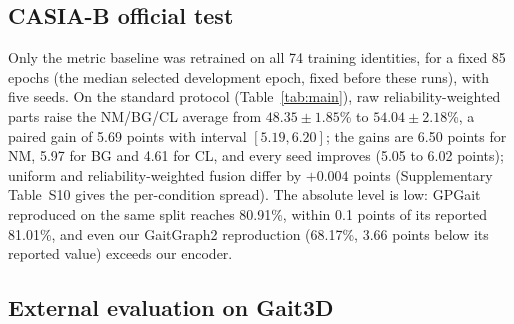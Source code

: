 \documentclass[journal]{IEEEtran}
\newcommand{\tablesetup}{\footnotesize\setlength{\tabcolsep}{4pt}}
\begin{document}
\subsection{CASIA-B official test}

Only the metric baseline was retrained on all 74 training identities, for a
fixed 85 epochs (the median selected development epoch, fixed before these
runs), with five seeds. On the standard protocol (Table~\ref{tab:main}),
raw reliability-weighted parts raise the NM/BG/CL average from
$48.35\pm1.85$\% to $54.04\pm2.18$\%, a paired gain of 5.69 points with interval
$[5.19,6.20]$; the gains are 6.50 points for NM, 5.97 for BG and 4.61 for CL,
and every seed improves (5.05 to 6.02 points); uniform and reliability-weighted
fusion differ by $+0.004$ points (Supplementary Table~S10 gives the
per-condition spread). The absolute level is low: GPGait reproduced on the same
split reaches 80.91\%, within 0.1 points of its reported 81.01\%, and even our
GaitGraph2 reproduction (68.17\%, 3.66 points below its reported value) exceeds
our encoder.

\begin{table}[!t]
\centering
\caption{Test-set comparison, Rank-1 and mAP (\%). CASIA-B uses identities
075--124 with the standard single-view protocol excluding identical views;
Gait3D uses the available-pose subset (947 probes, 5,122 gallery sequences),
evaluated once with the recipe frozen on development data. Our rows are means
over five seeds of the metric baseline; reproduced baselines were trained once
with official FastPoseGait configurations, and reported values are those of the
FastPoseGait model zoo \cite{meng2023fastposegait} on the complete benchmarks.
Panel (b) rescores the same GPGait checkpoints (full: all 19 embeddings); raw
parts are fused at $\lambda=0.5$. Parameter counts include identity
classifiers. Standard deviations, further metrics and paired intervals are in
Supplementary Tables~S10--S12.}
\label{tab:main}
{\tablesetup\setlength{\tabcolsep}{2.5pt}
}
\end{table}

\subsection{External evaluation on Gait3D}
\end{document}
